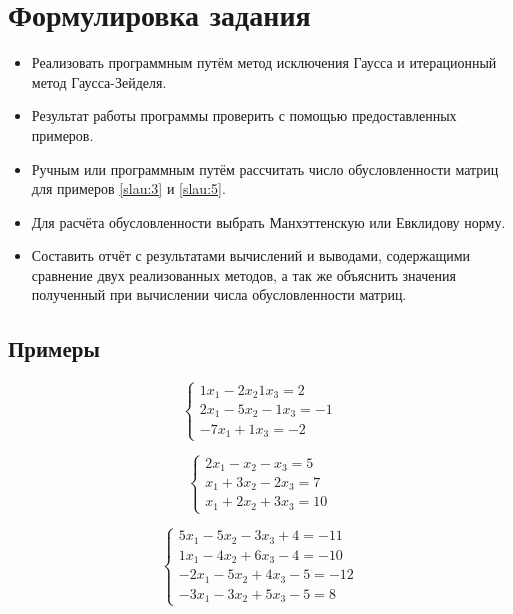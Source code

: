 \documentclass[a4paper]{article}
\begin{document}
\section{Формулировка задания}
\begin{itemize}
    \item Реализовать программным путём метод исключения Гаусса и итерационный метод Гаусса-Зейделя. 
    \item Результат работы программы проверить с помощью предоставленных примеров.
    \item Ручным или программным путём рассчитать число обусловленности матриц для примеров \eqref{slau:3} и \eqref{slau:5}.
    \item Для расчёта обусловленности выбрать Манхэттенскую или Евклидову норму.
    \item Составить отчёт с результатами вычислений и выводами, содержащими сравнение двух реализованных методов, а так же объяснить значения полученный при вычислении числа обусловленности матриц.
\end{itemize}

\subsection{Примеры}

\begin{equation}
    \begin{cases*}
        1 x_1  -2 x_2 1  x_3 = 2 \\
        2 x_1  -5 x_2 -1 x_3 = -1 \\
        -7x_1   + 1x_3 = -2
    \end{cases*} \label{slau:1}
\end{equation}

\begin{equation}
    \begin{cases*}
        2x_1 - x_2 - x_3 = 5 \\
        x_1 + 3x_2 - 2x_3 = 7 \\
        x_1 + 2x_2 + 3x_3 = 10
    \end{cases*} \label{slau:2}
\end{equation}

\begin{equation}
    \begin{cases}
        5  x_1 -5 x_2 -3 x_3 +4 = -11 \\
        1  x_1 -4 x_2 +6 x_3 -4 = -10 \\
        -2 x_1 -5 x_2 +4 x_3 -5 = -12 \\
        -3 x_1 -3 x_2 +5 x_3 -5 = 8
    \end{cases} \label{slau:3}
\end{equation}
\end{document}
